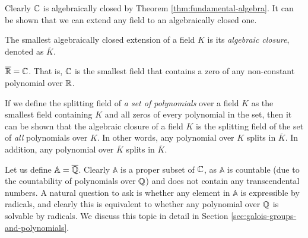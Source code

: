Clearly $\mathbb C$ is algebraically closed by Theorem \ref{thm:fundamental-algebra}. It can be shown that we can extend any field to an algebraically closed one. 

\begin{definition}
	The smallest algebraically closed extension of a field $K$ is its \textit{algebraic closure}, denoted as $\overline K$.
\end{definition}

\begin{example}
	$\overline {\mathbb R}  =  \mathbb C$. That is, $\mathbb C$ is the smallest field that contains a zero of any non-constant polynomial over $\mathbb R$.
\end{example}


If we define the splitting field of \textit{a set of polynomials} over a field $K$ as the smallest field containing $K$ and all zeros of every polynomial in the set, then it can be shown that the algebraic closure of a field $K$ is the splitting field of the set of \textit{all} polynomials over $K$. In other words, any polynomial over $K$ splits in $\overline K$. In addition, any polynomial over $\overline K$ splits in $\overline K$.

Let us define $\mathbb A = \overline {\mathbb Q}$. Clearly $\mathbb A$ is a proper subset of $\mathbb C$, as $\mathbb A$ is countable (due to the countability of polynomials over $\mathbb Q$) and does not contain any transcendental numbers. A natural question to ask is whether any element in $\mathbb A$ is expressible by radicals, and clearly this is equivalent to whether any polynomial over $\mathbb Q$ is solvable by radicals. We discuss this topic in detail in Section \ref{sec:galois-groups-and-polynomials}. 

%
%

%



